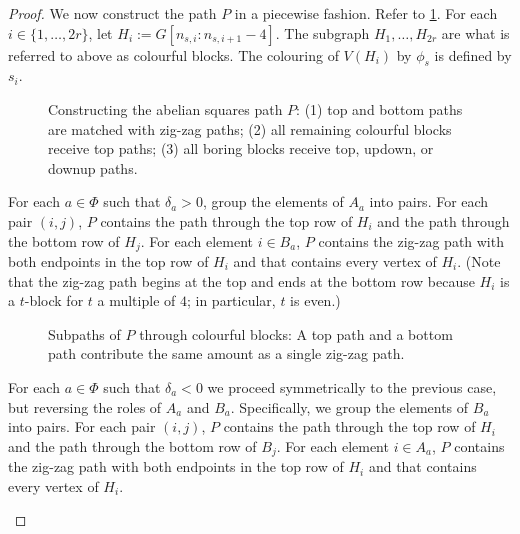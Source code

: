 \documentclass{patmorin}
\begin{document}
\begin{proof}
    We now construct the path $P$ in a piecewise fashion.  Refer to \cref{path_construction}.  For each $i\in\{1,\ldots,2r\}$, let $H_i:=G[n_{s,i}:n_{s,i+1}-4]$. The subgraph $H_1,\ldots,H_{2r}$ are what is referred to above as colourful blocks.  The colouring of $V(H_i)$ by $\phi_s$ is defined by $s_i$.
    \begin{figure}
        \caption{Constructing the abelian squares path $P$:
            (1) top and bottom paths are matched with zig-zag paths;
            (2) all remaining colourful blocks receive top paths;
            (3) all boring blocks receive top, updown, or downup paths.
        }
        \label{path_construction}
    \end{figure}
    \begin{compactenum}
        \item For each $a\in\Phi$ such that $\delta_a>0$, group the elements of $A_a$ into pairs.  For each pair $(i,j)$, $P$ contains the path through the top row of $H_i$ and the path through the bottom row of $H_j$.  For each element $i\in B_a$, $P$ contains the zig-zag path with both endpoints in the top row of $H_i$ and that contains every vertex of $H_i$.  (Note that the zig-zag path begins at the top and ends at the bottom row because $H_i$ is a $t$-block for $t$ a multiple of $4$; in particular, $t$ is even.)

        \begin{figure}
            \caption{Subpaths of $P$ through colourful blocks: A top path and a bottom path contribute the same amount as a single zig-zag path.}
        \end{figure}

        \item For each $a\in\Phi$ such that $\delta_a<0$ we proceed symmetrically to the previous case, but reversing the roles of $A_a$ and $B_a$.  Specifically, we group the elements of $B_a$ into pairs.  For each pair $(i,j)$, $P$ contains the path through the top row of $H_i$ and the path through the bottom row of $B_j$.  For each element $i\in A_a$, $P$ contains the zig-zag path with both endpoints in the top row of $H_i$ and that contains every vertex of $H_i$.


\end{compactenum}
\end{proof}
\end{document}
